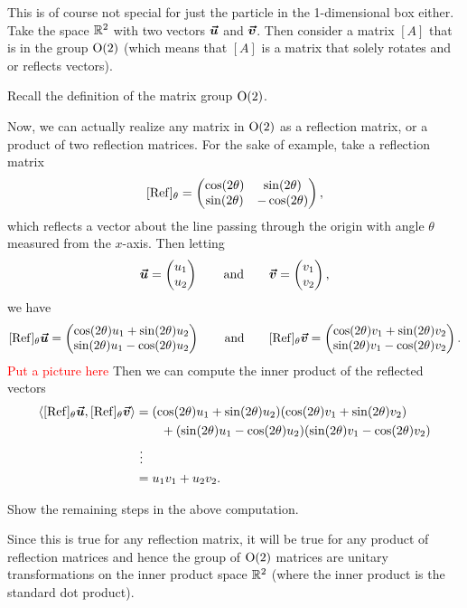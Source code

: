This is of course not special for just the particle in the 1-dimensional box either. Take the space $\mathbb{R}^2$ with two vectors $\boldsymbol{\boldsymbol{\vec{u}}}$ and $\boldsymbol{\boldsymbol{\vec{v}}}$. Then consider a matrix $[A]$ that is in the group $\mathrm{O}(2)$ (which means that $[A]$ is a matrix that solely rotates and or reflects vectors).
\begin{exercise}
	Recall the definition of the matrix group $\mathrm{O}(2)$.
\end{exercise}
Now, we can actually realize any matrix in $\mathrm{O}(2)$ as a reflection matrix, or a product of two reflection matrices. For the sake of example, take a reflection matrix
\[
[\mathrm{Ref}]_\theta = \begin{pmatrix} \cos (2\theta) & \sin(2\theta) \\ \sin(2\theta) & -\cos(2\theta) \end{pmatrix},
\]
which reflects a vector about the line passing through the origin with angle $\theta$ measured from the $x$-axis.  Then letting
\[
\boldsymbol{\boldsymbol{\vec{u}}} = \begin{pmatrix} u_1 \\ u_2 \end{pmatrix} \qquad \textrm{and} \qquad \boldsymbol{\boldsymbol{\vec{v}}} = \begin{pmatrix} v_1 \\ v_2 \end{pmatrix},
\]
 we have
\[
[\mathrm{Ref}]_\theta \boldsymbol{\boldsymbol{\vec{u}}} = \begin{pmatrix} \cos(2\theta)u_1+\sin(2\theta)u_2 \\  \sin(2\theta)u_1-\cos(2\theta)u_2 \end{pmatrix} \qquad \textrm{and} \qquad [\mathrm{Ref}]_\theta \boldsymbol{\boldsymbol{\vec{v}}} = \begin{pmatrix} \cos(2\theta)v_1+\sin(2\theta)v_2 \\  \sin(2\theta)v_1-\cos(2\theta)v_2 \end{pmatrix}.
\]
\textcolor{red}{Put a picture here}
Then we can compute the inner product of the reflected vectors 
\begin{align*}
\left\langle [\mathrm{Ref}]_\theta \boldsymbol{\boldsymbol{\vec{u}}}, [\mathrm{Ref}]_\theta \boldsymbol{\boldsymbol{\vec{v}}} \right\rangle&= (\cos(2\theta)u_1+\sin(2\theta)u_2)(\cos(2\theta)v_1+\sin(2\theta)v_2 )\\
&\qquad + (\sin(2\theta)u_1-\cos(2\theta)u_2)(\sin(2\theta)v_1-\cos(2\theta)v_2)\\
&~\vdots\\
&= u_1v_1 + u_2v_2.
\end{align*}
\begin{exercise}
	Show the remaining steps in the above computation.
\end{exercise}
Since this is true for any reflection matrix, it will be true for any product of reflection matrices and hence the group of $\mathrm{O}(2)$ matrices are unitary transformations on the inner product space $\mathbb{R}^2$ (where the inner product is the standard dot product).

